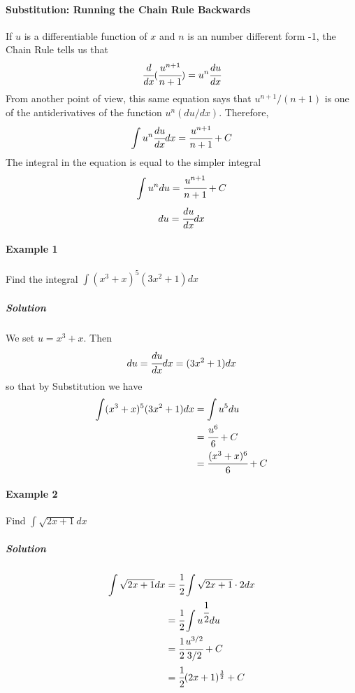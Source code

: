 \documentclass{article}
\begin{document}
            \paragraph{Substitution: Running the Chain Rule Backwards}
                If $u$ is a differentiable function of $x$ and $n$ is an number different form -1, the Chain Rule tells us that 
                \[\cfrac{d}{dx}(\cfrac{u^{n+1}}{n+1})=u^n\cfrac{du}{dx}\]
                From another point of view, this same equation says that $u^{n+1}/(n+1)$ is one of the antiderivatives of the function $u^n(du/dx)$. Therefore,
                \[\int u^n\cfrac{du}{dx}dx=\cfrac{u^{n+1}}{n+1}+C\]
                The integral in the equation is equal to the simpler integral
                \[\int u^n du=\cfrac{u^{n+1}}{n+1}+C\]
                \[du=\cfrac{du}{dx}dx\]
            \paragraph{Example 1} Find the integral $\int (x^3+x)^5 (3x^2+1)dx$
                \subparagraph{Solution} We set $u=x^3+x$. Then
                \[du=\cfrac{du}{dx}dx=(3x^2+1)dx\]
                so that by Substitution we have
                \begin{equation}
                    \begin{aligned}
                        \int (x^3+x)^5(3x^2+1)dx&=\int u^5 du\\
                        &=\cfrac{u^6}{6}+C\\
                        &=\cfrac{(x^3+x)^6}{6}+C\\
                    \end{aligned}
                \end{equation}
            \paragraph{Example 2} Find $\int \sqrt{2x+1}dx$
                \subparagraph{Solution} 
                \begin{equation}
                    \begin{aligned}
                        \int \sqrt{2x+1}dx&=\cfrac{1}{2}\int \sqrt{2x+1}\cdot 2dx\\
                        &=\cfrac{1}{2}\int u^{\cfrac{1}{2}}du\\
                        &=\cfrac{1}{2}\cfrac{u^{3/2}}{3/2}+C\\
                        &=\cfrac{1}{2}(2x+1)^{\frac{3}{2}}+C
                    \end{aligned}
                \end{equation}
\end{document}

